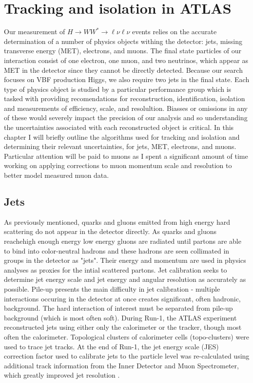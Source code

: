 \section{Tracking and isolation in ATLAS}
Our measurement of $H\rightarrow WW^*\rightarrow \ell\nu\ell\nu$ events relies on the accurate determination of a number of physics objects withing the detector: jets, missing transverse energy (MET), electrons, and muons. The final state particles of our interaction consist of one electron, one muon, and two neutrinos, which appear as MET in the detector since they cannot be directly detected. Because our search focuses on VBF production Higgs, we also require two jets in the final state. Each type of physics object is studied by a particular performance group which is tasked with providing recomendations for reconstruction, identification, isolation and measurements of efficiency, scale, and resolultion. Biasses or omissions in any of these would severely impact the precision of our analysis and so understanding the uncertainties associated with each reconstructed object is critical. In this chapter I will briefly outline the algorithms used for tracking and isolation and determining their relevant uncertainties, for jets, MET, electrons, and muons. Particular attention will be paid to muons as I spent a significant amount of time working on applying corrections to muon momentum scale and resolution to better model measured muon data. 
\subsection{Jets}
As previously mentioned, quarks and gluons emitted from high energy hard scattering do not appear in the detector directly. As quarks and gluons reachehigh enough energy low energy gluons are radiated until partons are able to bind into color-neutral hadrons and these hadrons are seen collimated in groups in the detector as "jets". Their energy and momentum are used in physics analyses as proxies for the intial scattered partons. Jet calibration seeks to determine jet energy scale and jet energy and angular resolution as accurately as possible. Pile-up presents the main difficulty in jet calibration - multiple interactions occuring in the detector at once creates significant, often hadronic, background. The hard interaction of interest must be separated from pile-up background (which is most often soft). During Run-1, the ATLAS experiment reconstructed jets using either only the calorimeter or the tracker, though most often the calorimeter. Topological clusters of calorimeter cells (topo-clusters) were used to trace jet tracks. At the end of Run-1, the jet energy scale (JES) correction factor used to calibrate jets to the particle level was re-calculated using additional track information from the Inner Detector and Muon Spectrometer, which greatly improved jet resolution \cite{JetRun1}. 

